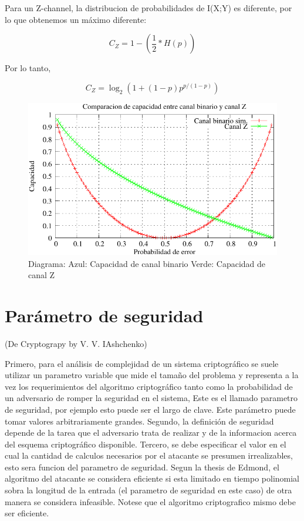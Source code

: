 \documentclass[a4paper,12pt]{article}
\begin{document}
Para un Z-channel, la distribucion de probabilidades de I(X;Y) es diferente, por lo que obtenemos un máximo diferente:

$$ C_{Z} = 1 - \left(\frac{1}{2}*H(p)\right) $$ \cite{tallini}

Por lo tanto,

$$ C_{Z} = \log_2\left(1+(1-p) p^{p/(1-p)}\right) $$


\begin{figure}[th]
  \begin{center}
    \includegraphics[scale=0.9]{comparacionBZ}
  \end{center}
  \caption{Diagrama: Azul: Capacidad de canal binario Verde: Capacidad de canal Z}
  \label{fig:CompBZ}
\end{figure}

\section{Parámetro de seguridad}
(De Cryptograpy by V. V. IAshchenko)\cite{primes}

Primero, para el análisis de complejidad de un sistema criptográfico se suele utilizar un parametro variable que mide el tamaño del problema y representa a la vez los requerimientos del algoritmo criptográfico tanto como la probabilidad de un adversario de romper la seguridad en el sistema, Este es el llamado parametro de seguridad, por ejemplo esto puede ser el largo de clave.
Este parámetro puede tomar valores arbitrariamente grandes.
Segundo, la definición de seguridad depende de la tarea que el adversario trata de realizar y de la informacion acerca del esquema criptográfico disponible.
Tercero, se debe especificar el valor en el cual la cantidad de calculos necesarios por el atacante se presumen irrealizables, esto sera funcion del parametro de seguridad.
Segun la thesis de Edmond, el algoritmo del atacante se considera eficiente si esta limitado en tiempo polinomial sobra la longitud de la entrada (el parametro de seguridad en este caso) de otra manera se considera infeasible.
Notese que el algoritmo criptografico mismo debe ser eficiente.
\end{document}
